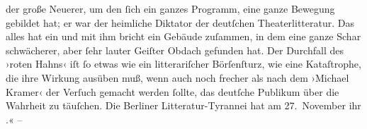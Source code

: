 {{                     der große Neuerer, um den ſich ein ganzes Programm, eine ganze Bewegung
                     gebildet hat; er war der heimliche Diktator der deutſchen Theaterlitteratur. Das alles
                     hat ein \label{T_L03093-1v}\label{T_L03093-1} und mit ihm bricht ein Gebäude zuſammen,
                     in dem eine ganze Schar schwächerer, aber ſehr lauter Geiſter Obdach gefunden
                     hat. Der Durchfall des ›roten Hahns‹ iſt
                     ſo etwas wie ein litterariſcher Börſenſturz, wie eine Kataſtrophe, die ihre
                     Wirkung ausüben muß, wenn auch noch frecher als nach dem ›Michael Kramer‹ der Verſuch gemacht werden ſollte, das
                        deutſche Publikum über
                     die Wahrheit zu täuſchen. Die Berliner
                     Litteratur-Tyrannei hat am 27. November ihr
                        \label{T_L03093-2v}\label{T_L03093-2}.« –}}\pend
           \endnumbering{}  
      